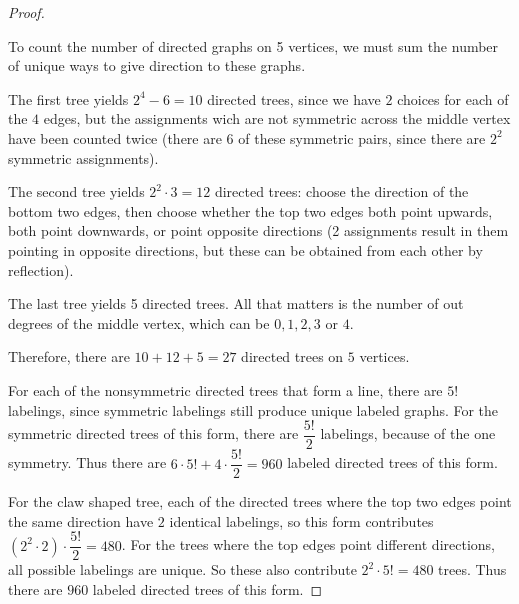 \documentclass[12pt]{article}
\begin{document}
\begin{enumerate}[leftmargin=0cm,itemindent=.5cm,labelwidth=\itemindent,labelsep=0cm,align=left]
\begin{proof}
\begin{figure}[h!]
\begin{center}
\end{center}
\end{figure}

To count the number of directed graphs on 5 vertices, we must sum the number of unique ways to give direction to these graphs.

The first tree yields $2^4 - 6 = 10$ directed trees, since we have $2$ choices for each of the $4$ edges, but the assignments wich are not symmetric across the middle vertex have been counted twice (there are 6 of these symmetric pairs, since there are $2^2$ symmetric assignments).

The second tree yields $2^2 \cdot 3 = 12$ directed trees: choose the direction of the bottom two edges, then choose whether the top two edges both point upwards, both point downwards, or point opposite directions (2 assignments result in them pointing in opposite directions, but these can be obtained from each other by reflection).

The last tree yields 5 directed trees.  All that matters is the number of out degrees of the middle vertex, which can be $0, 1, 2, 3$ or $4$.

Therefore, there are $10 + 12 + 5 = 27$ directed trees on $5$ vertices.


For each of the nonsymmetric directed trees that form a line, there are $5!$ labelings, since symmetric labelings still produce unique labeled graphs.  For the symmetric directed trees of this form, there are $\dfrac{5!}{2}$ labelings, because of the one symmetry.  Thus there are $6 \cdot 5! + 4 \cdot \dfrac{5!}{2} = 960$ labeled directed trees of this form.


For the claw shaped tree, each of the directed trees where the top two edges point the same direction have $2$ identical labelings, so this form contributes $(2^2 \cdot 2) \cdot \dfrac{5!}{2} = 480$.  For the trees where the top edges point different directions, all possible labelings are unique.  So these also contribute $2^2 \cdot 5! = 480$ trees.  Thus there are $960$ labeled directed trees of this form.


\end{proof}
\end{enumerate}
\end{document}
